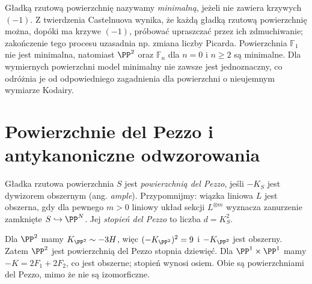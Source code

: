 \begin{uwaga}
Gładką rzutową powierzchnię nazywamy \emph{minimalną},
jeżeli nie zawiera krzywych $(-1)$. Z twierdzenia
Castelnuova wynika, że każdą gładką rzutową powierzchnię
można, dopóki ma krzywe $(-1)$, próbować upraszczać
przez ich zdmuchiwanie; zakończenie tego procesu
uzasadnia np. zmiana liczby Picarda. Powierzchnia
$\mathbb F_1$ nie jest minimalna, natomiast
$\PP^2$ oraz $\mathbb F_n$ dla $n=0$ i $n\ge2$
są minimalne. Dla wymiernych powierzchni model minimalny
nie zawsze jest jednoznaczny, co odróżnia je od
odpowiedniego zagadnienia dla powierzchni o nieujemnym
wymiarze Kodairy.
\end{uwaga}

\section{Powierzchnie del Pezzo i antykanoniczne odwzorowania}
\label{sec:ga6-delpezzo}

\begin{definicja}
Gładka rzutowa powierzchnia $S$ jest \emph{powierzchnią
del Pezzo}, jeśli $-K_S$ jest dywizorem obszernym
(ang. \emph{ample}). Przypomnijmy: wiązka liniowa $L$
jest obszerna, gdy dla pewnego $m>0$ liniowy układ
sekcji $L^{\otimes m}$ wyznacza zanurzenie zamknięte
$S\hookrightarrow\PP^N$. Jej \emph{stopień del Pezzo}
to liczba $d=K_S^2$.
\end{definicja}

\begin{przyklad}
Dla $\PP^2$ mamy $K_{\PP^2}\sim-3H$,
więc $(-K_{\PP^2})^2=9$ i $-K_{\PP^2}$ jest
obszerny. Zatem $\PP^2$ jest powierzchnią del Pezzo
stopnia dziewięć. Dla $\PP^1\times\PP^1$
mamy $-K=2F_1+2F_2$, co jest obszerne;
stopień wynosi osiem. Obie są powierzchniami
del Pezzo, mimo że nie są izomorficzne.
\end{przyklad}

